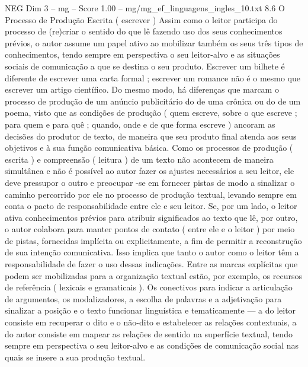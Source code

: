 \begin{textsample}{NEG Dim 3 – mg – Score 1.00 – mg/mg\_ef\_linguagens\_ingles\_10.txt}  \label{ex:f3_neg_030}
8.6 O Processo de Produção Escrita ( escrever ) Assim como o leitor participa do processo de (re)criar o sentido do que lê fazendo uso dos seus conhecimentos prévios, o autor assume um papel ativo ao mobilizar também os seus três tipos de conhecimentos, tendo sempre em perspectiva o seu leitor-alvo e as situações sociais de comunicação a que se destina o seu produto.
Escrever um bilhete é diferente de escrever uma carta formal ; escrever um romance não é o mesmo que escrever um artigo científico.
Do mesmo modo, há diferenças que marcam o processo de produção de um anúncio publicitário do de uma crônica ou do de um poema, visto que as condições de produção ( quem escreve, sobre o que escreve ; para quem e para quê ; quando, onde e de que forma escreve ) ancoram as decisões do produtor de texto, de maneira que seu produto final atenda aos seus objetivos e à sua função comunicativa básica.
Como os processos de produção ( escrita ) e compreensão ( leitura ) de um texto não acontecem de maneira simultânea e não é possível ao autor fazer os ajustes necessários a seu leitor, ele deve pressupor o outro e preocupar -se em fornecer pistas de modo a sinalizar o caminho percorrido por ele no processo de produção textual, levando sempre em conta o pacto de responsabilidade entre ele e seu leitor.
Se, por um lado, o leitor ativa conhecimentos prévios para atribuir significados ao texto que lê, por outro, o autor colabora para manter pontos de contato ( entre ele e o leitor ) por meio de pistas, fornecidas implícita ou explicitamente, a fim de permitir a reconstrução de sua intenção comunicativa.
Isso implica que tanto o autor como o leitor têm a responsabilidade de fazer o uso dessas indicações.
Entre as marcas explícitas que podem ser mobilizadas para a organização textual estão, por exemplo, os recursos de referência ( lexicais e gramaticais ).
Os conectivos para indicar a articulação de argumentos, os modalizadores, a escolha de palavras e a adjetivação para sinalizar a posição e o texto funcionar linguística e tematicamente — a do leitor consiste em recuperar o dito e o não-dito e estabelecer as relações contextuais, a do autor consiste em mapear as relações de sentido na superfície textual, tendo sempre em perspectiva o seu leitor-alvo e as condições de comunicação social nas quais se insere a sua produção textual.

\end{textsample}

